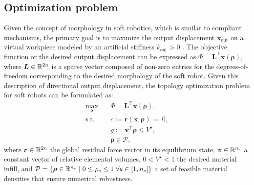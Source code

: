 \subsection{Optimization problem}
Given the concept of morphology in soft robotics, which is similar to compliant mechanisms, the primary goal is to maximize the output displacement $\boldsymbol{x}_{\textrm{out}}$ on a virtual workpiece modeled by an artificial stiffness $k_{\textrm{out}} > 0$ \cite{Bendsoe2003,Gain2013Dec}. The objective function or the desired output displacement can be expressed as $\Phi = \boldsymbol{L}^\top\boldsymbol{x}(\boldsymbol{\rho})$, where $\boldsymbol{L} \in \mathbb{R}^{2n}$ is a sparse vector composed of non-zero entries for the degrees-of-freedom corresponding to the desired morphology of the soft robot. Given this description of directional output displacement, the topology optimization problem for soft robots can be formulated as:
\begin{equation}
\begin{aligned}
\max_{\boldsymbol{\rho}} \quad &  \Phi = \boldsymbol{L}^\top \boldsymbol{x}(\boldsymbol{\rho}), \\
\textrm{s.t.} \quad & c:=\boldsymbol{r}(\boldsymbol{x},\boldsymbol{\rho}) \,= \,0,\\
& g:=\boldsymbol{v}^\top \boldsymbol{\rho}  \le V^\star, \\
  &\boldsymbol{\rho} \in \mathcal{P},
  \label{eq:opt}
\end{aligned}
\end{equation}
where $\boldsymbol{r} \in \mathbb{R}^{2n}$ the global residual force vector in its equilibrium state, $\boldsymbol{v} \in \mathbb{R}^{n_e}$ a constant vector of relative elemental volumes, $ 0 < V^\star < 1$ the desired material infill, and $\mathcal{P} = \{\boldsymbol{\rho} \in \mathbb{R}^{n_e} \; | \; 0  \le \rho_e \le 1 \; \forall e \in [1,n_e] \}$ a set of feasible material densities that ensure numerical robustness.

